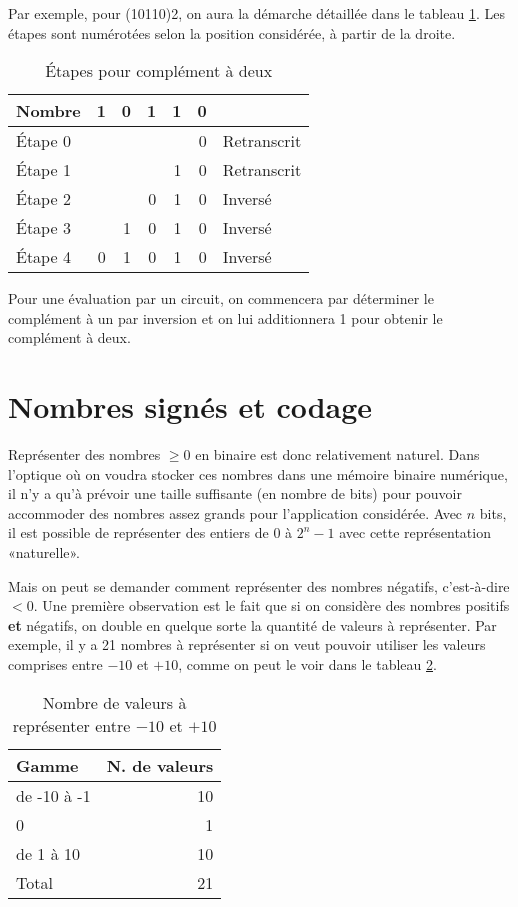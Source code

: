 \documentclass[letter, oneside]{book}
\begin{document}
\begin{enumerate}
Par exemple, pour (10110)2, on aura la démarche détaillée dans le
tableau \ref{tab:org335d3de}. Les étapes sont numérotées selon la position
considérée, à partir de la droite.

\begin{table}[htbp]
\caption{\label{tab:org335d3de}Étapes pour complément à deux}
\centering
\begin{tabular}{lrrrrrl}
Nombre & 1 & 0 & 1 & 1 & 0 & \\[0pt]
\hline
Étape 0 &  &  &  &  & 0 & Retranscrit\\[0pt]
Étape 1 &  &  &  & 1 & 0 & Retranscrit\\[0pt]
Étape 2 &  &  & 0 & 1 & 0 & Inversé\\[0pt]
Étape 3 &  & 1 & 0 & 1 & 0 & Inversé\\[0pt]
Étape 4 & 0 & 1 & 0 & 1 & 0 & Inversé\\[0pt]
\end{tabular}
\end{table}

Pour une évaluation par un circuit, on commencera par déterminer le
complément à un par inversion et on lui additionnera 1 pour obtenir le
complément à deux.
\end{enumerate}

\section{Nombres signés et codage}
\label{sec:org40065bb}

Représenter des nombres \(\geq 0\) en binaire est donc relativement
naturel. Dans l'optique où on voudra stocker ces nombres dans une
mémoire binaire numérique, il n'y a qu'à prévoir une taille suffisante
(en nombre de bits) pour pouvoir accommoder des nombres assez grands
pour l'application considérée. Avec \(n\) bits, il est possible de
représenter des entiers de \(0\) à \(2^n-1\) avec cette représentation
«naturelle».

Mais on peut se demander comment représenter des nombres négatifs,
c'est-à-dire \(< 0\). Une première observation est le fait que si on
considère des nombres positifs \textbf{et} négatifs, on double en quelque
sorte la quantité de valeurs à représenter. Par exemple, il y a 21
nombres à représenter si on veut pouvoir utiliser les valeurs
comprises entre \(-10\) et \(+10\), comme on peut le voir dans le
tableau \ref{tab:org17e6737}.

\begin{table}[htbp]
\caption{\label{tab:org17e6737}Nombre de valeurs à représenter entre \(-10\) et \(+10\)}
\centering
\begin{tabular}{lr}
Gamme & N. de valeurs\\[0pt]
\hline
de -10 à -1 & 10\\[0pt]
0 & 1\\[0pt]
de 1 à 10 & 10\\[0pt]
\hline
Total & 21\\[0pt]
\end{tabular}
\end{table}
\end{document}
